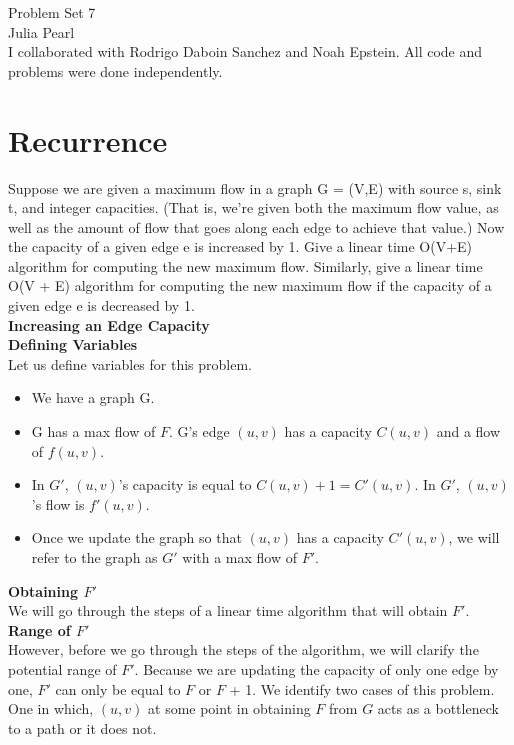 \documentclass[11pt, solution, letterpaper]{format}
\begin{document}
Problem Set 7\\
Julia Pearl\\

I collaborated with Rodrigo Daboin Sanchez and Noah Epstein. All code and problems were done independently.
\clearpage
\section{Recurrence}
Suppose we are given a maximum flow in a graph G = (V,E) with source s, sink t, and integer capacities.
(That is, we’re given both the maximum flow value, as well as the amount of flow that goes along each edge
to achieve that value.) Now the capacity of a given edge e is increased by 1. Give a linear time O(V+E)
algorithm for computing the new maximum flow. Similarly, give a linear time O(V + E) algorithm for
computing the new maximum flow if the capacity of a given edge e is decreased by 1.\\

\textbf{Increasing an Edge Capacity}\\

\textbf{Defining Variables}\\
Let us define variables for this problem. 
\begin{itemize}
    \item We have a graph G. 
    \item G has a max flow of $F$.
    \itme G's edge $(u, v)$  has a capacity $C(u, v)$ and a flow of $f(u, v)$. 
    \item In $G'$, $(u, v)$'s capacity is equal to $C(u, v) + 1 = C'(u, v)$. In $G'$, $(u, v)$'s flow is $f'(u, v)$.
    \item Once we update the graph so that $(u, v)$ has a capacity $C'(u, v)$, we will refer to the graph as $G'$ with a max flow of $F'$.
\end{itemize}  

\textbf{Obtaining $F'$}\\
We will go through the steps of a linear time algorithm that will obtain $F'$. \\

\textbf{Range of $F'$}\\
However, before we go through the steps of the algorithm, we will clarify the potential range of $F'$. Because we are updating the capacity of only one edge by one, $F'$ can only be equal to $F$ or $F$ + 1. We identify two cases of this problem. One in which, $(u, v)$ at some point in obtaining $F$ from $G$ acts as a bottleneck to a path or it does not. \\
\end{document}
